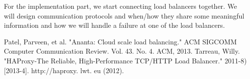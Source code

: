 \documentclass[11pt,letter]{article}
\begin{document}
For the implementation part, we start connecting load balancers together. We will design communication protocols and when/how they share some meaningful information and how we will handle a failure at one of the load balancers. 

\begin{thebibliography}{9}
  Patel, Parveen, et al. "Ananta: Cloud scale load balancing." ACM SIGCOMM Computer Communication Review. Vol. 43. No. 4. ACM, 2013.
  Tarreau, Willy. "HAProxy-The Reliable, High-Performance TCP/HTTP Load Balancer." 2011-8)[2013-4]. http://haproxy. lwt. eu (2012).
\end{thebibliography}
\end{document}
